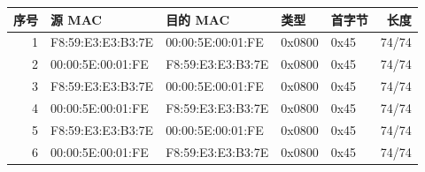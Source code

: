 \begin{tabular}{rllllr}\toprule
序号 & 源 MAC & 目的 MAC & 类型 & 首字节 & 长度 \\ \midrule
1 & F8:59:E3:E3:B3:7E & 00:00:5E:00:01:FE & 0x0800 & 0x45 & 74/74 \\
2 & 00:00:5E:00:01:FE & F8:59:E3:E3:B3:7E & 0x0800 & 0x45 & 74/74 \\
3 & F8:59:E3:E3:B3:7E & 00:00:5E:00:01:FE & 0x0800 & 0x45 & 74/74 \\
4 & 00:00:5E:00:01:FE & F8:59:E3:E3:B3:7E & 0x0800 & 0x45 & 74/74 \\
5 & F8:59:E3:E3:B3:7E & 00:00:5E:00:01:FE & 0x0800 & 0x45 & 74/74 \\
6 & 00:00:5E:00:01:FE & F8:59:E3:E3:B3:7E & 0x0800 & 0x45 & 74/74 \\
\bottomrule\end{tabular}
